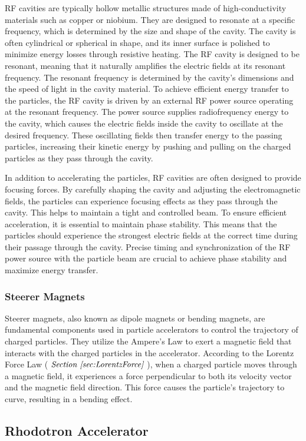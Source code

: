 \documentclass{article}
\begin{document}
RF cavities are typically hollow metallic structures made of high-conductivity materials such as copper or niobium. 
They are designed to resonate at a specific frequency, which is determined by the size and shape of the cavity. 
The cavity is often cylindrical or spherical in shape, and its inner surface is polished to minimize energy losses through resistive heating.
The RF cavity is designed to be resonant, meaning that it naturally amplifies the electric fields at its resonant frequency. 
The resonant frequency is determined by the cavity's dimensions and the speed of light in the cavity material.
To achieve efficient energy transfer to the particles, the RF cavity is driven by an external RF power source operating at the resonant frequency. 
The power source supplies radiofrequency energy to the cavity, which causes the electric fields inside the cavity to oscillate at the desired frequency. 
These oscillating fields then transfer energy to the passing particles, increasing their kinetic energy by pushing and pulling on the charged particles as they pass through the cavity. 

In addition to accelerating the particles, RF cavities are often designed to provide focusing forces. 
By carefully shaping the cavity and adjusting the electromagnetic fields, the particles can experience focusing effects as they pass through the cavity. 
This helps to maintain a tight and controlled beam. To ensure efficient acceleration, it is essential to maintain phase stability. 
This means that the particles should experience the strongest electric fields at the correct time during their passage through the cavity. 
Precise timing and synchronization of the RF power source with the particle beam are crucial to achieve phase stability and maximize energy transfer.


\subsubsection{Steerer Magnets}
Steerer magnets, also known as dipole magnets or bending magnets, are fundamental components used in particle accelerators to control the trajectory of charged particles. 
They utilize the Ampere's Law to exert a magnetic field that interacts with the charged particles in the accelerator. 
According to the Lorentz Force Law ( $\textit{Section \ref{sec:LorentzForce}}$ ), when a charged particle moves through a magnetic field, it experiences a force perpendicular to both its velocity 
vector and the magnetic field direction. This force causes the particle's trajectory to curve, resulting in a bending effect.


\subsection{Rhodotron Accelerator}

\end{document}
